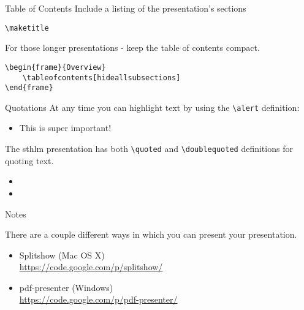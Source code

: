 \documentclass[compress]{beamer}
\begin{document}
\begin{frame}[containsverbatim]{Table of Contents}
Include a listing of the presentation's sections 
\begin{lstlisting}
\maketitle
\end{lstlisting}
For those longer presentations - keep the table of contents compact.
\begin{lstlisting}
\begin{frame}{Overview}
	\tableofcontents[hideallsubsections]
\end{frame}
\end{lstlisting}
\end{frame}


\begin{frame}[containsverbatim]{Quotations}
At any time you can highlight text by using the \lstinline!\alert! definition:
\begin{itemize}
	\item \alert{This is super important!}
\end{itemize}
The sthlm presentation has both \lstinline!\quoted! and \lstinline!\doublequoted! definitions for quoting text.
\begin{itemize}
	\item[] 
	\item[] 
\end{itemize}
\end{frame}


\begin{frame}{Notes}
    
    There are a couple different ways in which you can present your presentation.

	\begin{itemize}
		\item Splitshow (Mac OS X)\\\url{https://code.google.com/p/splitshow/}
		\item pdf-presenter (Windows)\\\url{https://code.google.com/p/pdf-presenter/}
	\end{itemize}
\end{frame}
\end{document}
